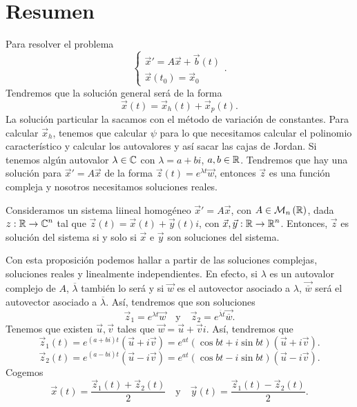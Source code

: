 \section{Resumen}
Para resolver el problema
\[
\begin{cases}
\vec{x}'=A\vec{x} + \vec{b}\left(t\right) \\
\vec{x}\left(t_{0}\right)=\vec{x}_{0}
\end{cases}
.\]
Tendremos que la solución general será de la forma
\[\vec{x}\left(t\right)=\vec{x}_{h}\left(t\right)+\vec{x}_{p}\left(t\right) .\]
La solución particular la sacamos con el método de variación de constantes. Para calcular $\displaystyle \vec{x}_{h} $, tenemos que calcular $\displaystyle \psi $ para lo que necesitamos calcular el polinomio característico y calcular los autovalores y así sacar las cajas de Jordan. Si tenemos algún autovalor $\displaystyle \lambda \in \mathbb{C} $ con $\displaystyle \lambda = a + bi $, $\displaystyle a,b \in \mathbb{R} $. Tendremos que hay una solución para $\displaystyle \vec{x}' = A \vec{x} $ de la forma $\displaystyle \vec{z}\left(t\right)=e^{\lambda t}\vec{w} $, entonces $\displaystyle \vec{z} $ es una función compleja y nosotros necesitamos soluciones reales.
\begin{prop}
Consideramos un sistema liineal homogéneo $\displaystyle \vec{x}'=A\vec{x} $, con $\displaystyle A \in \mathcal{M}_{n}\left(\mathbb{R}\right) $, dada $\displaystyle z : \mathbb{R} \to \mathbb{C}^{n} $ tal que $\displaystyle \vec{z}\left(t\right)= \vec{x}\left(t\right)+\vec{y}\left(t\right)i $, con $\displaystyle \vec{x}, \vec{y} : \mathbb{R} \to \mathbb{R}^{n} $. Entonces, $\displaystyle \vec{z} $ es solución del sistema si y solo si $\displaystyle \vec{x} $ e $\displaystyle \vec{y} $ son soluciones del sistema. 
\end{prop}
Con esta proposición podemos hallar a partir de las soluciones complejas, soluciones reales y linealmente independientes. En efecto, si $\displaystyle \lambda  $ es un autovalor complejo de $\displaystyle A $, $\displaystyle \overline{\lambda } $ también lo será y si $\displaystyle \vec{w} $ es el autovector asociado a $\displaystyle \lambda  $, $\displaystyle \vec{\overline{w}} $ será el autovector asociado a $\displaystyle  \overline{\lambda } $. Así, tendremos que son soluciones
\[\vec{z}_{1}=e^{\lambda t}\vec{w} \quad \text{y} \quad \vec{z}_{2}=e^{\overline{\lambda }t}\vec{\overline{w}} .\]
Tenemos que existen $\displaystyle \vec{u}, \vec{v} $ tales que $\displaystyle \vec{w}= \vec{u}+\vec{v}i $. Así, tendremos que 
\[\vec{z}_{1}\left(t\right)=e^{\left(a+bi\right)t}\left(\vec{u}+i\vec{v}\right) = e^{at}\left(\cos bt + i \sin bt\right)\left(\vec{u}+i\vec{v}\right) .\]
\[\vec{z}_{2}\left(t\right)=e^{\left(a-bi\right)t}\left(\vec{u}-i\vec{v}\right)= e^{at}\left(\cos bt - i\sin bt\right)\left(\vec{u}-i\vec{v}\right) .\]
Cogemos 
\[\vec{x}\left(t\right)=\frac{\vec{z}_{1}\left(t\right)+\vec{z}_{2}\left(t\right)}{2} \quad \text{y} \quad \vec{y}\left(t\right)=\frac{\vec{z}_{1}\left(t\right)-\vec{z}_{2}\left(t\right)}{2} .\]
